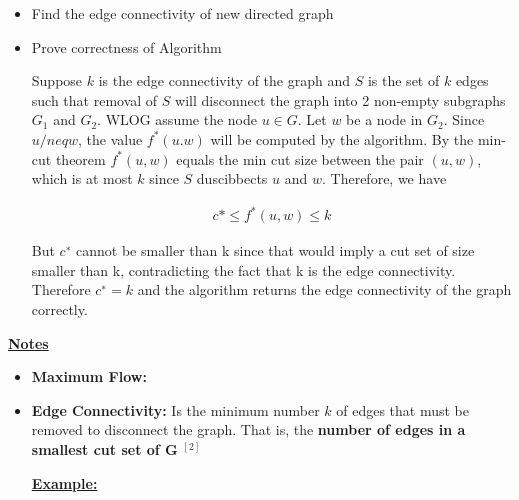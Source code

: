 \documentclass[12pt]{article}
\begin{document}
\begin{enumerate}[1.]
\begin{itemize}
\begin{mdframed}
        \end{mdframed}

        \item Find the edge connectivity of new directed graph

        \begin{mdframed}

        \end{mdframed}

        \item Prove correctness of Algorithm

        \bigskip

        Suppose $k$ is the edge connectivity of the graph and $S$ is the set of $k$
        edges such that removal of $S$ will disconnect the graph into
        2 non-empty subgraphs $G_1$ and $G_2$. WLOG assume the node $u \in G$.
        Let $w$ be a node in $G_2$. Since $u /neq w$, the value $f^*(u.w)$ will be computed
        by the algorithm. By the min-cut theorem $f^*(u,w)$ equals the min cut size
        between the pair $(u,w)$, which is at most $k$ since $S$ duscibbects $u$ and $w$.
        Therefore, we have

        \begin{align}
            c* \leq f^*(u,w) \leq k
        \end{align}

        But $c^{∗}$ cannot be smaller than k since that would imply a cut set of size smaller than k,
        contradicting the fact that k is the edge connectivity. Therefore $c^{∗} = k$ and the algorithm
        returns the edge connectivity of the graph correctly.

    \end{itemize}
    \bigskip

    \underline{\textbf{Notes}}

    \begin{itemize}

        \item \textbf{Maximum Flow:}
        \item \textbf{Edge Connectivity:} Is the minimum number $k$ of edges
        that must be removed to disconnect the graph. That is, the \textbf{number of edges
        in a smallest cut set of G} $^{[2]}$

        \bigskip

        \underline{\textbf{Example:}}

        \bigskip


\end{itemize}
\end{enumerate}
\end{document}
